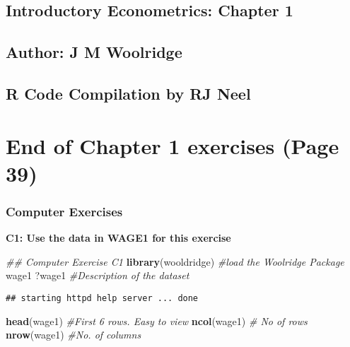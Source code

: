 \documentclass[
]{article}
\author{}
\date{\vspace{-2.5em}}
\newenvironment{Shaded}{\begin{snugshade}}{\end{snugshade}}
\newcommand{\CommentTok}[1]{\textcolor[rgb]{0.56,0.35,0.01}{\textit{#1}}}
\newcommand{\KeywordTok}[1]{\textcolor[rgb]{0.13,0.29,0.53}{\textbf{#1}}}
\newcommand{\NormalTok}[1]{#1}
\begin{document}
\hypertarget{introductory-econometrics-chapter-1}{%
\subsection{Introductory Econometrics: Chapter
1}\label{introductory-econometrics-chapter-1}}

\hypertarget{author-j-m-woolridge}{%
\subsection{Author: J M Woolridge}\label{author-j-m-woolridge}}

\hypertarget{r-code-compilation-by-rj-neel}{%
\subsection{R Code Compilation by RJ
Neel}\label{r-code-compilation-by-rj-neel}}

\hypertarget{end-of-chapter-1-exercises-page-39}{%
\section{End of Chapter 1 exercises (Page
39)}\label{end-of-chapter-1-exercises-page-39}}

\hypertarget{computer-exercises}{%
\subsubsection{Computer Exercises}\label{computer-exercises}}

\textbf{C1: Use the data in WAGE1 for this exercise}

\begin{Shaded}
\begin{Highlighting}[]
\CommentTok{## Computer Exercise C1}
\KeywordTok{library}\NormalTok{(wooldridge) }\CommentTok{#load the Woolridge Package}
\NormalTok{wage1}
\NormalTok{?wage1 }\CommentTok{#Description of the dataset}
\end{Highlighting}
\end{Shaded}

\begin{verbatim}
## starting httpd help server ... done
\end{verbatim}

\begin{Shaded}
\begin{Highlighting}[]
\KeywordTok{head}\NormalTok{(wage1) }\CommentTok{#First 6 rows. Easy to view}
\KeywordTok{ncol}\NormalTok{(wage1) }\CommentTok{# No of rows}
\KeywordTok{nrow}\NormalTok{(wage1) }\CommentTok{#No. of columns}
\end{Highlighting}
\end{Shaded}
\end{document}
